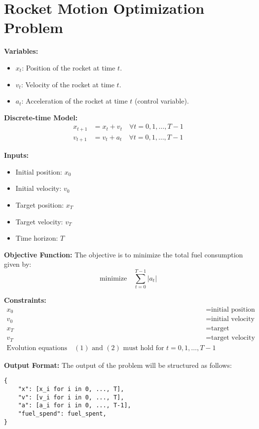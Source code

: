 \documentclass{article}
\begin{document}
\section*{Rocket Motion Optimization Problem}

\textbf{Variables:}
\begin{itemize}
    \item $x_t$: Position of the rocket at time $t$.
    \item $v_t$: Velocity of the rocket at time $t$.
    \item $a_t$: Acceleration of the rocket at time $t$ (control variable).
\end{itemize}

\textbf{Discrete-time Model:}
\begin{align}
    x_{t+1} &= x_t + v_t \quad \forall t = 0, 1, \dots, T-1 \\
    v_{t+1} &= v_t + a_t \quad \forall t = 0, 1, \dots, T-1
\end{align}

\textbf{Inputs:}
\begin{itemize}
    \item Initial position: $x_0$
    \item Initial velocity: $v_0$
    \item Target position: $x_T$
    \item Target velocity: $v_T$
    \item Time horizon: $T$
\end{itemize}

\textbf{Objective Function:}
The objective is to minimize the total fuel consumption given by:
\[
\text{minimize} \quad \sum_{t=0}^{T-1} |a_t|
\]

\textbf{Constraints:}
\begin{align}
    x_0 &= \text{initial position} \\
    v_0 &= \text{initial velocity} \\
    x_T &= \text{target position} \\
    v_T &= \text{target velocity} \\
    \text{Evolution equations}\quad (1) \text{ and } (2) \text{ must hold for } t=0,1,\ldots,T-1
\end{align}

\textbf{Output Format:}
The output of the problem will be structured as follows:
\begin{verbatim}
{
    "x": [x_i for i in 0, ..., T],
    "v": [v_i for i in 0, ..., T],
    "a": [a_i for i in 0, ..., T-1],
    "fuel_spend": fuel_spent,
}
\end{verbatim}
\end{document}
